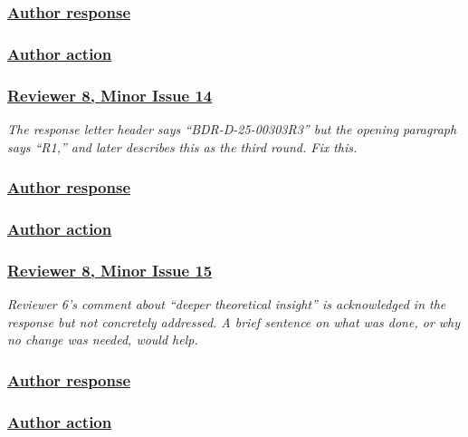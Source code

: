 \documentclass[journal,12pt, onecolumn]{IEEEtran}
\begin{document}
{\color{black}
\subsubsection*{\textbf{\underline{Author response}}}
}


{\color{black}
\subsubsection*{\textbf{\underline{Author action}}}
}


{\color{customgreen}
\subsubsection*{\underline{\textbf{Reviewer 8, Minor Issue 14}}}
\emph{The response letter header says ``BDR-D-25-00303R3'' but the opening paragraph says ``R1,'' and later describes this as the third round. Fix this.}
}


{\color{black}
\subsubsection*{\textbf{\underline{Author response}}}
}


{\color{black}
\subsubsection*{\textbf{\underline{Author action}}}
}


{\color{customgreen}
\subsubsection*{\underline{\textbf{Reviewer 8, Minor Issue 15}}}
\emph{Reviewer 6's comment about ``deeper theoretical insight'' is acknowledged in the response but not concretely addressed. A brief sentence on what was done, or why no change was needed, would help.}
}


{\color{black}
\subsubsection*{\textbf{\underline{Author response}}}
}


{\color{black}
\subsubsection*{\textbf{\underline{Author action}}}
}


\newpage
\end{document}
